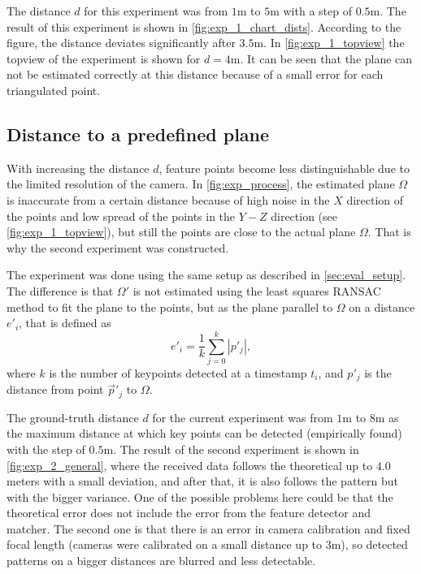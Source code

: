 The distance $d$ for this experiment was from $1$m to $5$m with a step of $0.5$m.
The result of this experiment is shown in \autoref{fig:exp_1_chart_dists}.
According to the figure, the distance deviates significantly after $3.5$m.
In \autoref{fig:exp_1_topview} the topview of the experiment is shown for $d=4$m.
It can be seen that the plane can not be estimated correctly at this distance because of a small error for each triangulated point.

\subsection{Distance to a predefined plane}
\label{sec:exp2}
With increasing the distance $d$, feature points become less distinguishable due to the limited resolution of the camera.
In \autoref{fig:exp_process}, the estimated plane $\Omega$ is inaccurate from a certain distance because of high noise in the $X$ direction of the points and low spread of the points in the $Y-Z$ direction (see \autoref{fig:exp_1_topview}), but still the points are close to the actual plane $\Omega$.
That is why the second experiment was constructed.

The experiment was done using the same setup as described in \autoref{sec:eval_setup}. 
The difference is that $\Omega'$ is not estimated using the least squares RANSAC method to fit the plane to the points, but as the plane parallel to $\Omega$ on a distance $e'_i$, that is defined as
\begin{equation}    
    e'_i = \frac{1}{k} \sum_{j=0}^{k}{|p'_j|},
\end{equation}
where $k$ is the number of keypoints detected at a timestamp $t_i$, and $p'_j$ is the distance from point $\vec{p}'_j$ to $\Omega$.


The ground-truth distance $d$ for the current experiment was from $1$m to $8$m as the maximum distance at which key points can be detected (empirically found) with the step of $0.5$m.
The result of the second experiment is shown in \autoref{fig:exp_2_general}, where the received data follows the theoretical up to $4.0$ meters with a small deviation, and after that, it is also follows the pattern but with the bigger variance.
One of the possible problems here could be that the theoretical error does not include the error from the feature detector and matcher.
The second one is that there is an error in camera calibration and fixed focal length (cameras were calibrated on a small distance up to $3$m), so detected patterns on a bigger distances are blurred and less detectable. 

